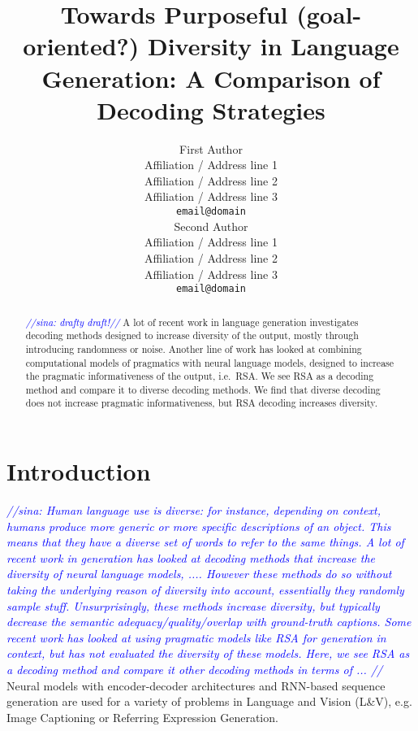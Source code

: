 \documentclass[11pt,a4paper]{article}
\title{Towards Purposeful (goal-oriented?) Diversity in Language Generation: A Comparison of Decoding Strategies}
\author{First Author \\
  Affiliation / Address line 1 \\
  Affiliation / Address line 2 \\
  Affiliation / Address line 3 \\
  \texttt{email@domain} \\\And
  Second Author \\
  Affiliation / Address line 1 \\
  Affiliation / Address line 2 \\
  Affiliation / Address line 3 \\
  \texttt{email@domain} \\}
\date{}
\newcommand{\sina}[1]{\textcolor{blue}{\emph{//sina: #1//}}}
\begin{document}
\maketitle


\begin{abstract}
\sina{drafty draft!} A lot of recent work in language generation investigates decoding methods designed to increase diversity of the output, mostly through introducing randomness or noise.
Another line of work has looked at combining computational models of pragmatics with neural language models, designed to increase the pragmatic informativeness of the output, i.e.\ RSA.
We see RSA as a decoding method and compare it to diverse decoding methods. 
We find that diverse decoding does not increase pragmatic informativeness, but RSA decoding increases diversity.
\end{abstract}


\section{Introduction}


\sina{Human language use is diverse: for instance, depending on context, humans produce more generic or more specific descriptions of an object. This means that they have a diverse set of words to refer to the same things.\citet{Cruse1977}
A lot of recent work in generation has looked at decoding methods that increase the diversity of neural language models, .... However these methods do so without taking the underlying reason of diversity into account, essentially they randomly sample stuff.
Unsurprisingly, these methods increase diversity, but typically decrease the semantic adequacy/quality/overlap with ground-truth captions.
Some recent work has looked at using pragmatic models like RSA for generation in context, but has not evaluated the diversity of these models.
Here, we see RSA as a decoding method and compare it other decoding methods in terms of ...
}
Neural models with encoder-decoder architectures and RNN-based sequence generation are used for a variety of problems in Language and Vision (L\&V), e.g. Image Captioning or Referring Expression Generation. 
\end{document}
